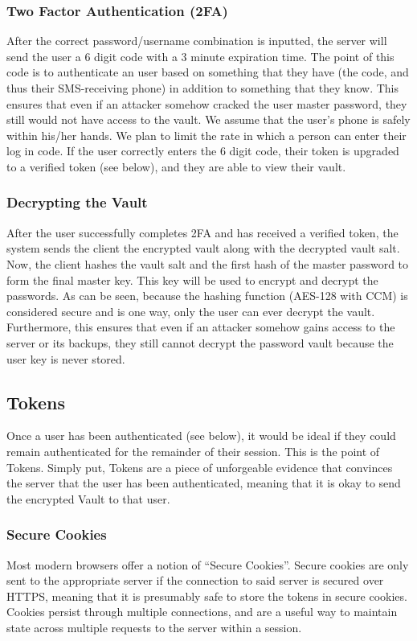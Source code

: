 \documentclass{article}
\begin{document}
\subsubsection{Two Factor Authentication (2FA)}
\par After the correct password/username combination is inputted, the server will send the user a 6 digit code with a 3 minute expiration time. The point of this code is to authenticate an user based on something that they have (the code, and thus their SMS-receiving phone) in addition to something that they know. This ensures that even if an attacker somehow cracked the user master password, they still would not have access to the vault. We assume that the user's phone is safely within his/her hands. We plan to limit the rate in which a person can enter their log in code. If the user correctly enters the 6 digit code, their token is upgraded to a verified token (see below), and they are able to view their vault.

\subsubsection{Decrypting the Vault}
After the user successfully completes 2FA and has received a verified token, the system sends the client the encrypted vault along with the decrypted vault salt. Now, the client hashes the vault salt and the first hash of the master password to form the final master key. This key will be used to encrypt and decrypt the passwords. As can be seen, because the hashing function (AES-128 with CCM) is considered secure and is one way, only the user can ever decrypt the vault. Furthermore, this ensures that even if an attacker somehow gains access to the server or its backups, they still cannot decrypt the password vault because the user key is never stored.

\subsection{Tokens}
\label{sub:tokens}
\par Once a user has been authenticated (see below), it would be ideal if they could remain authenticated for the remainder of their session. This is the point of Tokens. Simply put, Tokens are a piece of unforgeable evidence that convinces the server that the user has been authenticated, meaning that it is okay to send the encrypted Vault to that user.

\subsubsection{Secure Cookies}
\label{ssub:secure_cookies}
\par Most modern browsers offer a notion of ``Secure Cookies''. Secure cookies are only sent to the appropriate server if the connection to said server is secured over HTTPS, meaning that it is presumably safe to store the tokens in secure cookies. Cookies persist through multiple connections, and are a useful way to maintain state across multiple requests to the server within a session.
\end{document}
